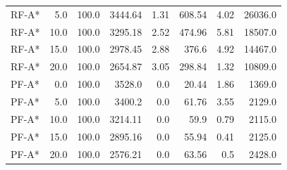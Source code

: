 \begin{tabular}{lrrrrrrr}
RF-A* & 5.0 & 100.0 & 3444.64 & 1.31 & 608.54 & 4.02 & 26036.0 \\
RF-A* & 10.0 & 100.0 & 3295.18 & 2.52 & 474.96 & 5.81 & 18507.0 \\
RF-A* & 15.0 & 100.0 & 2978.45 & 2.88 & 376.6 & 4.92 & 14467.0 \\
RF-A* & 20.0 & 100.0 & 2654.87 & 3.05 & 298.84 & 1.32 & 10809.0 \\
PF-A* & 0.0 & 100.0 & 3528.0 & 0.0 & 20.44 & 1.86 & 1369.0 \\
PF-A* & 5.0 & 100.0 & 3400.2 & 0.0 & 61.76 & 3.55 & 2129.0 \\
PF-A* & 10.0 & 100.0 & 3214.11 & 0.0 & 59.9 & 0.79 & 2115.0 \\
PF-A* & 15.0 & 100.0 & 2895.16 & 0.0 & 55.94 & 0.41 & 2125.0 \\
PF-A* & 20.0 & 100.0 & 2576.21 & 0.0 & 63.56 & 0.5 & 2428.0 \\
\hline
\end{tabular}
